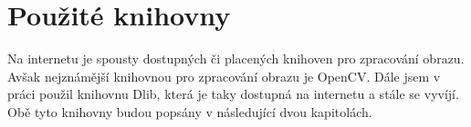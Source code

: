 \section{Použité knihovny}
Na internetu je spousty dostupných či placených knihoven pro zpracování obrazu. Avšak nejznámější knihovnou pro zpracování obrazu je OpenCV. Dále jsem v práci použil knihovnu Dlib, která je taky dostupná na internetu a stále se vyvíjí. Obě tyto knihovny budou popsány v následující dvou kapitolách.